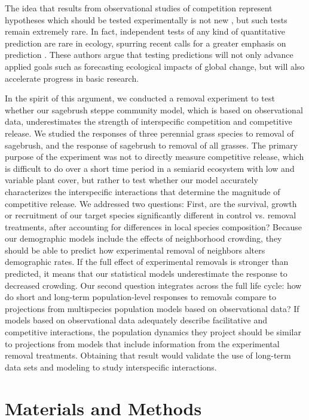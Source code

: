 \documentclass[11pt]{article}
\begin{document}
\begin{doublespacing}
The idea that results from observational studies of competition represent hypotheses which should be tested experimentally is not new \citep{Hairston1980}, but such tests remain extremely rare. In fact, independent tests of any kind of quantitative prediction are rare in ecology, spurring recent calls for a greater emphasis on prediction \citep{Mouquet2015,Petchey2015,Houlahan2017}. These authors argue that testing predictions will not only advance applied goals such as forecasting ecological impacts of global change, but will also accelerate progress in basic research.

In the spirit of this argument, we conducted a removal experiment to test whether our sagebrush steppe community model, which is based on observational data, underestimates the strength of interspecific competition and competitive release. We studied the responses of three perennial grass species to removal of sagebrush, and the response of sagebrush to removal of all grasses. The primary purpose of the experiment was not to directly measure competitive release, which is difficult to do over a short time period in a semiarid ecosystem with low and variable plant cover, but rather to test whether our model accurately characterizes the interspecific interactions that determine the magnitude of competitive release. We addressed two questions: First, are the survival, growth or recruitment of our target species significantly different in control vs. removal treatments, after accounting for differences in local species composition? Because our demographic models include the effects of neighborhood crowding, they should be able to predict how experimental removal of neighbors alters demographic rates. If the full effect of experimental removals is stronger than predicted, it means that our statistical models underestimate the response to decreased crowding. Our second question integrates across the full life cycle: how do short and long-term population-level responses to removals compare to projections from multispecies population models based on observational data? If models based on observational data adequately describe facilitative and competitive interactions, the population dynamics they project should be similar to projections from models that include information from the experimental removal treatments. 
Obtaining that result would validate the use of long-term data sets and modeling to study interspecific interactions. 

\section*{Materials and Methods}


\end{doublespacing}
\end{document}
